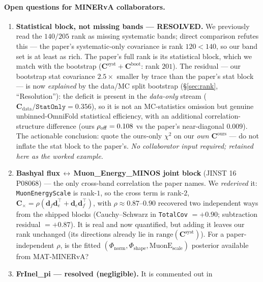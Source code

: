\documentclass[12pt]{article}
\newcommand{\ours}{\text{ours}}
\newcommand{\boot}{\text{boot}}
\newcommand{\syst}{\text{syst}}
\newcommand{\T}{^{\!\top}}
\begin{document}
\paragraph{Open questions for MINERvA collaborators.}
\begin{enumerate}[nosep,leftmargin=2em]
  \item \textbf{Statistical block, not missing bands --- RESOLVED.} We
        previously read the $140/205$ rank as missing systematic bands; direct
        comparison refutes this --- the paper's systematic-only covariance is
        rank $120<140$, so our band set is at least as rich. The paper's full
        rank is its statistical block, which we match with the bootstrap
        ($\mathbf{C}^{\syst}+\mathbf{C}^{\boot}$: rank $201$). The residual ---
        our bootstrap stat covariance $2.5\times$ smaller by trace than the
        paper's stat block --- is now \emph{explained} by the data/MC split
        bootstrap (\S\ref{sec:rank}, ``Resolution''): the deficit is present in
        the \emph{data-only} stream ($\mathbf{C}_{\mathrm{data}}/\texttt{StatOnly}
        =0.356$), so it is not an MC-statistics omission but genuine
        unbinned-OmniFold statistical efficiency, with an additional
        correlation-structure difference (ours $\rho_{\rm off}=0.108$ vs the
        paper's near-diagonal $0.009$). The actionable conclusion: quote the
        ours-only $\chi^{2}$ on our \emph{own} $\mathbf{C}^{\ours}$ --- do not
        inflate the stat block to the paper's. \emph{No collaborator input
        required; retained here as the worked example.}
  \item \textbf{Bashyal flux\,$\leftrightarrow$\,Muon\_Energy\_MINOS joint
        block} (JINST 16 P08068) --- the only cross-band correlation the
        paper names. We \emph{rederived} it: \texttt{MuonEnergyScale} is
        rank-$1$, so the cross term is rank-$2$,
        $\mathbf{C}_{\times}=\rho(\mathbf{d}_{f}\mathbf{d}_{e}\T+\mathbf{d}_{e}\mathbf{d}_{f}\T)$,
        with $\rho\approx0.87$--$0.90$ recovered two independent ways from
        the shipped blocks (Cauchy--Schwarz in \texttt{TotalCov} $=+0.90$;
        subtraction residual $=+0.87$). It is real and now quantified, but
        adding it leaves our rank unchanged (its directions already lie in
        $\mathrm{range}(\mathbf{C}^{\syst})$). For a paper-independent $\rho$,
        is the fitted $(\Phi_{\text{norm}},\Phi_{\text{shape}},
        \text{MuonE}_{\text{scale}})$ posterior available from MAT-MINERvA?
  \item \textbf{FrInel\_pi --- resolved (negligible).} It is commented out in

\end{enumerate}
\end{document}
